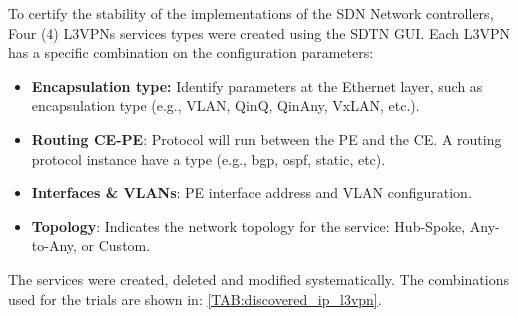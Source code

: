 \documentclass[a4paper,fleqn]{cas-dc}
\begin{document}
To certify the stability of the implementations of the SDN Network controllers, Four (4) L3VPNs services types were created using the SDTN GUI. Each L3VPN has a specific combination on the configuration parameters:

\begin{itemize}
    \item \textbf{Encapsulation type:} Identify parameters at the Ethernet layer, such as encapsulation type (e.g., VLAN, QinQ, QinAny, VxLAN, etc.).
    \item \textbf{Routing CE-PE}: Protocol will run between the PE and the CE. A routing protocol instance have a type (e.g., bgp, ospf, static, etc).
    \item \textbf{Interfaces \& VLANs}: PE interface address and VLAN configuration.
    \item \textbf{Topology}: Indicates the network topology for the service: Hub-Spoke, Any-to-Any, or Custom. 
\end{itemize}

The services were created, deleted and modified systematically. The combinations used for the trials are shown in: \cref{TAB:discovered_ip_l3vpn}.
\end{document}
